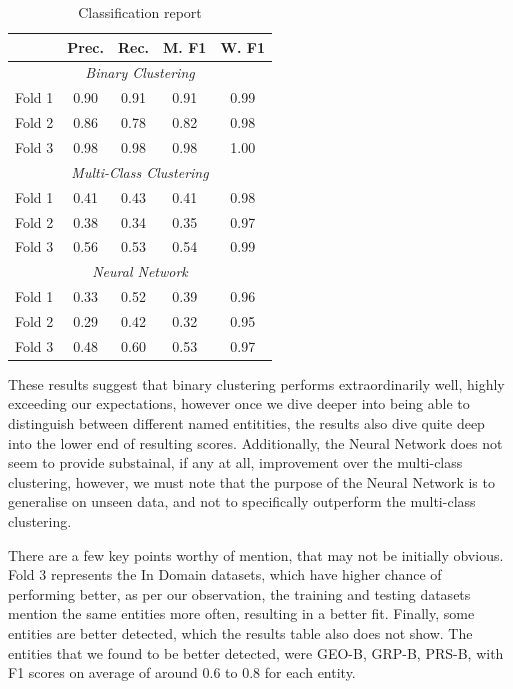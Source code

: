 \documentclass[11pt]{article}
\begin{document}
\begin{table}[H]
  \centering
  \begin{tabular}{|l|c|c|c|c|}
  \hline
  \textbf{} & \textbf{Prec.} & \textbf{Rec.} & \textbf{M. F1} & \textbf{W. F1} \\
  \hline
  \multicolumn{5}{|c|}{\textit{Binary Clustering}} \\
  \hline
  Fold 1   & 0.90 & 0.91 & 0.91 & 0.99 \\
  Fold 2   & 0.86 & 0.78 & 0.82 & 0.98 \\
  Fold 3   & 0.98 & 0.98 & 0.98 & 1.00 \\
  \hline
  \multicolumn{5}{|c|}{\textit{Multi-Class Clustering}} \\
  \hline
  Fold 1   & 0.41 & 0.43 & 0.41 & 0.98 \\
  Fold 2   & 0.38 & 0.34 & 0.35 & 0.97 \\
  Fold 3   & 0.56 & 0.53 & 0.54 & 0.99 \\
  \hline
  \multicolumn{5}{|c|}{\textit{Neural Network}} \\
  \hline
  Fold 1   & 0.33 & 0.52 & 0.39 & 0.96 \\
  Fold 2   & 0.29 & 0.42 & 0.32 & 0.95 \\
  Fold 3   & 0.48 & 0.60 & 0.53 & 0.97 \\
  \hline
  \end{tabular}
  \caption{Classification report}
  \label{tab:Classification-Report}
\end{table}

These results suggest that binary clustering performs extraordinarily well, highly exceeding our expectations, however once we dive deeper
into being able to distinguish between different named entitities, the results also dive quite deep into the lower end of resulting scores.
Additionally, the Neural Network does not seem to provide substainal, if any at all, improvement over the multi-class clustering, however,
we must note that the purpose of the Neural Network is to generalise on unseen data, and not to specifically outperform the multi-class clustering.

There are a few key points worthy of mention, that may not be initially obvious.
Fold 3 represents the In Domain datasets, which have higher chance of performing better, as per our observation, the training and testing
datasets mention the same entities more often, resulting in a better fit. Finally, some entities are better detected, which the results table
also does not show. The entities that we found to be better detected, were GEO-B, GRP-B, PRS-B, with F1 scores on average of around 0.6 to 0.8
for each entity.
\end{document}
